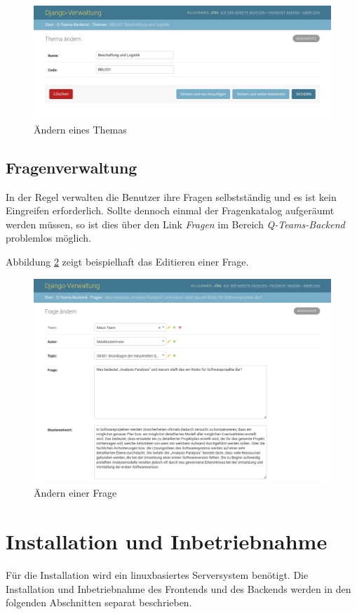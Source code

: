 \documentclass[a4paper,11pt,listof=numbered,glossary=totoc,parskip=half,toc=bib]{scrreprt}
\begin{document}
\begin{appendices}
	\begin{figure}
		\centering
		\includegraphics[width=\textwidth]{editthema}
		\caption{Ändern eines Themas}
		\label{fig:editthema}
	\end{figure}
	
	\section{Fragenverwaltung}
	In der Regel verwalten die Benutzer ihre Fragen selbstständig und es ist kein Eingreifen erforderlich. Sollte dennoch einmal der Fragenkatalog aufgeräumt werden müssen, so ist dies über den Link \textit{Fragen} im Bereich \textit{Q-Teams-Backend} problemlos möglich. 
	
	Abbildung \ref{fig:editfrage} zeigt beispielhaft das Editieren einer Frage.
	
	\begin{figure}
		\centering
		\includegraphics[width=\textwidth]{editfrage}
		\caption{Ändern einer Frage}
		\label{fig:editfrage}
	\end{figure}
	
	\chapter{Installation und Inbetriebnahme}
	Für die Installation wird ein linuxbasiertes Serversystem benötigt. Die Installation und Inbetriebnahme des Frontends und des Backends werden in den folgenden Abschnitten separat beschrieben.
	

\end{appendices}
\end{document}
